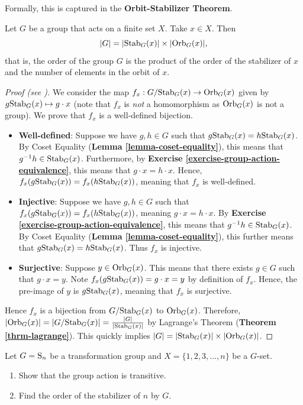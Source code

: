Formally, this is captured in the \textbf{Orbit-Stabilizer Theorem}.
\begin{theorem}\label{thrm-orbit-stabilizer}
    Let $G$ be a group that acts on a finite set $X$. Take $x \in X$. Then
    \[
        |G| = |\mathrm{Stab}_{G}(x)| \times |\mathrm{Orb}_{G}(x)|,
    \]
    that is, the order of the group $G$ is the product of the order of the stabilizer of $x$ and the number of elements in the orbit of $x$.
\end{theorem}

\begin{proof}[Proof (see \cite{humphreys_1996})]
    We consider the map $f_x: G/\mathrm{Stab}_{G}(x) \to \mathrm{Orb}_{G}(x)$ given by $g\mathrm{Stab}_{G}(x) \mapsto g \cdot x$ (note that $f_x$ is \textit{not} a homomorphism as $\mathrm{Orb}_{G}(x)$ is not a group). We prove that $f_x$ is a well-defined bijection.
    \begin{itemize}
        \item \textbf{Well-defined}: Suppose we have $g, h \in G$ such that $g\mathrm{Stab}_{G}(x) = h\mathrm{Stab}_{G}(x)$. By Coset Equality (\textbf{Lemma \ref{lemma-coset-equality}}), this means that $g^{-1}h \in \mathrm{Stab}_{G}(x)$. Furthermore, by \textbf{Exercise \ref{exercise-group-action-equivalence}}, this means that $g\cdot x = h\cdot x$. Hence, $f_x(g\mathrm{Stab}_{G}(x)) = f_x(h\mathrm{Stab}_{G}(x))$, meaning that $f_x$ is well-defined.
        \item \textbf{Injective}: Suppose we have $g, h \in G$ such that $f_x(g\mathrm{Stab}_{G}(x)) = f_x(h\mathrm{Stab}_{G}(x))$, meaning $g\cdot x = h\cdot x$. By \textbf{Exercise \ref{exercise-group-action-equivalence}}, this means that $g^{-1}h \in \mathrm{Stab}_{G}(x)$. By Coset Equality (\textbf{Lemma \ref{lemma-coset-equality}}), this further means that $g\mathrm{Stab}_{G}(x) = h\mathrm{Stab}_{G}(x)$. Thus $f_x$ is injective.
        \item \textbf{Surjective}: Suppose $y \in \mathrm{Orb}_{G}(x)$. This means that there exists $g \in G$ such that $g\cdot x = y$. Note $f_x(g\mathrm{Stab}_{G}(x)) = g\cdot x = y$ by definition of $f_x$. Hence, the pre-image of $y$ is $g\mathrm{Stab}_{G}(x)$, meaning that $f_x$ is surjective.
    \end{itemize}
    Hence $f_x$ is a bijection from $G/\mathrm{Stab}_{G}(x)$ to $\mathrm{Orb}_{G}(x)$. Therefore, $|\mathrm{Orb}_{G}(x)| = |G/\mathrm{Stab}_{G}(x)| = \frac{|G|}{|\mathrm{Stab}_{G}(x)|}$ by Lagrange's Theorem (\textbf{Theorem \ref{thrm-lagrange}}). This quickly implies $|G| = |\mathrm{Stab}_{G}(x)|\times|\mathrm{Orb}_{G}(x)|$.
\end{proof}

\begin{exercise}
    Let $G = \mathrm{S}_{n}$ be a transformation group and $X = \{1, 2, 3, \dots, n\}$ be a $G$-set.
    \begin{enumerate}[label=(\roman*)]
        \item Show that the group action is transitive.
        \item Find the order of the stabilizer of $n$ by $G$.
    \end{enumerate}
\end{exercise}

